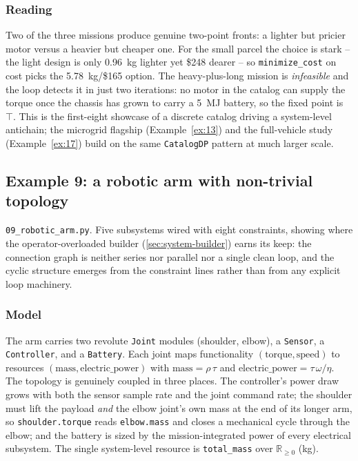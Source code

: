 \documentclass[11pt,a4paper]{article}
\newcommand{\Rplus}{\mathbb{R}_{\geq 0}}
\newcommand{\topp}{\top}
\begin{document}
\subsubsection*{Reading}

Two of the three missions produce genuine two-point fronts: a lighter but
pricier motor versus a heavier but cheaper one. For the small parcel the
choice is stark -- the light design is only 0.96~kg lighter yet \$248
dearer -- so \texttt{minimize\_cost} on cost picks the 5.78~kg/\$165
option. The heavy-plus-long mission is \emph{infeasible} and the loop
detects it in just two iterations: no motor in the catalog can supply the
torque once the chassis has grown to carry a 5~MJ battery, so the fixed
point is $\topp$. This is the first-eight showcase of a discrete catalog
driving a system-level antichain; the microgrid flagship
(Example~\ref{ex:13}) and the full-vehicle study
(Example~\ref{ex:17}) build on the same \texttt{CatalogDP} pattern at much
larger scale.

\subsection{Example 9: a robotic arm with non-trivial topology}
\label{ex:09}

\texttt{09\_robotic\_arm.py}. Five subsystems wired with eight
constraints, showing where the operator-overloaded builder
(\ref{sec:system-builder}) earns its keep: the connection graph is
neither series nor parallel nor a single clean loop, and the cyclic
structure emerges from the constraint lines rather than from any
explicit loop machinery.

\subsubsection*{Model}

The arm carries two revolute \texttt{Joint} modules (shoulder, elbow),
a \texttt{Sensor}, a \texttt{Controller}, and a \texttt{Battery}. Each
joint maps functionality $(\text{torque}, \text{speed})$ to resources
$(\text{mass}, \text{electric\_power})$ with
$\text{mass} = \rho\,\tau$ and
$\text{electric\_power} = \tau\,\omega / \eta$. The topology is
genuinely coupled in three places. The controller's power draw grows
with both the sensor sample rate and the joint command rate; the
shoulder must lift the payload \emph{and} the elbow joint's own mass at
the end of its longer arm, so \texttt{shoulder.torque} reads
\texttt{elbow.mass} and closes a mechanical cycle through the elbow;
and the battery is sized by the mission-integrated power of every
electrical subsystem. The single system-level resource is
\texttt{total\_mass} over $\Rplus$ (kg).
\end{document}
